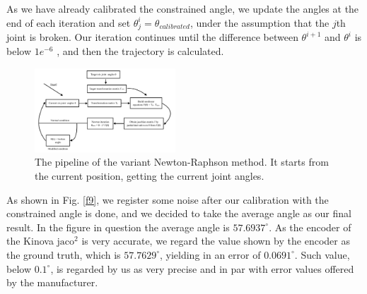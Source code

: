 \documentclass{ieeeaccess}
\newcommand{\degree}{^\circ}
\begin{document}
As we have already calibrated the constrained angle, we update the angles at the end of each iteration and set $\theta^{i}_j = \theta_{calibrated}$, under the assumption that the $j$th joint is broken. Our iteration continues until the difference between $\theta^{i+1}$ and $\theta^{i}$ is below $1e^{-6}$ , and then the trajectory is calculated.

\begin{figure}[t!]
	\centering
	\includegraphics[width=0.47\textwidth]{img/f8.pdf}
	\caption{The pipeline of the variant Newton-Raphson method. It starts from the current position, getting the current joint angles.}
	\label{f8}
\end{figure}


As shown in Fig. \ref{f9}, we register some noise after our calibration with the constrained angle is done, and we decided to take the average angle as our final result. In the figure in question the average angle is $57.6937 \degree$. As the encoder of the Kinova $\text{jaco}^2$ is very accurate, we regard the value shown by the encoder as the ground truth, which is $57.7629 \degree$, yielding in an error of $0.0691 \degree$. Such value, below $0.1 \degree$, is regarded by us as very precise and in par with error values offered by the manufacturer. 
\end{document}
